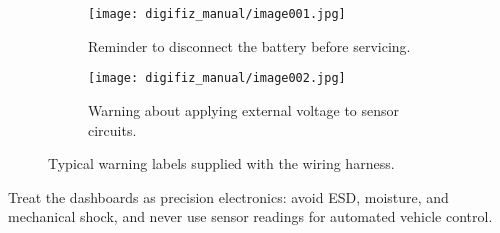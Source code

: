 \begin{figure}[htbp]
    \centering
    \begin{subfigure}{0.45\textwidth}
        \texttt{[image: digifiz\_manual/image001.jpg]}
        \caption{Reminder to disconnect the battery before servicing.}
    \end{subfigure}\hfill
    \begin{subfigure}{0.45\textwidth}
        \texttt{[image: digifiz\_manual/image002.jpg]}
        \caption{Warning about applying external voltage to sensor circuits.}
    \end{subfigure}
    \caption{Typical warning labels supplied with the wiring harness.}
\end{figure}

Treat the dashboards as precision electronics: avoid ESD, moisture, and mechanical shock, and never use sensor readings for automated vehicle control.

